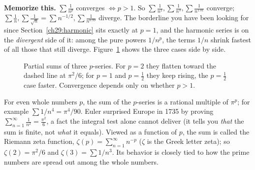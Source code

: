 \begin{focusbox}
\textbf{Memorize this.} $\sum \tfrac{1}{n^p}$ converges $\iff p > 1$. So $\sum\tfrac1{n^2}, \sum\tfrac1{n^3}, \sum\tfrac{1}{n^{1.01}}$ converge; $\sum\tfrac1n, \sum\tfrac{1}{\sqrt n}=\sum n^{-1/2}, \sum\tfrac{1}{n^{0.99}}$ diverge. The borderline you have been looking for since Section~\ref{ch29:harmonic} sits exactly at $p=1$, and the harmonic series is on the \emph{divergent} side of it: among the pure powers $1/n^p$, the terms $1/n$ shrink fastest of all those that still diverge. Figure~\ref{ch29:fig-pseries} shows the three cases side by side.
\end{focusbox}

\begin{figure}[H]
\centering
{}
\caption{Partial sums of three $p$-series. For $p=2$ they flatten toward the dashed line at $\pi^2/6$; for $p=1$ and $p=\tfrac12$ they keep rising, the $p=\tfrac12$ case faster. Convergence depends only on whether $p > 1$.}
\label{ch29:fig-pseries}
\end{figure}

\begin{connectionbox}
For even whole numbers $p$, the sum of the $p$-series is a rational multiple of $\pi^p$; for example $\sum 1/n^4 = \pi^4/90$. Euler surprised Europe in 1735 by proving $\sum_{n=1}^\infty \tfrac{1}{n^2} = \tfrac{\pi^2}{6}$, a fact the integral test alone cannot deliver (it tells you \emph{that} the sum is finite, not \emph{what} it equals). Viewed as a function of $p$, the sum is called the Riemann zeta function, $\zeta(p) = \sum_{n=1}^\infty n^{-p}$ ($\zeta$ is the Greek letter zeta); so $\zeta(2) = \pi^2/6$ and $\zeta(3) = \sum 1/n^3$. Its behavior is closely tied to how the prime numbers are spread out among the whole numbers.
\end{connectionbox}

